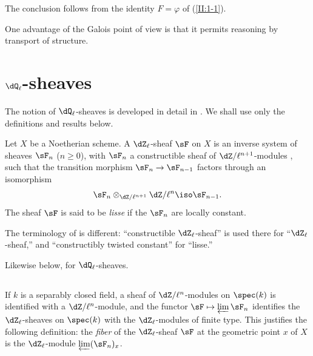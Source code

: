 \documentclass[oneside]{book}
\begin{document}
The conclusion follows from the identity $F=\varphi$ of (\ref{II:1-1}).

One advantage of the Galois point of view is that it permits reasoning by
transport of structure.










\section{\texorpdfstring{$\dQ_\ell$}{Ql}-sheaves}\label{II:2}

The notion of $\dQ_\ell$-sheaves is developed in detail in
\cite[V,VI]{sga5}. We shall use only the definitions and results below.






\begin{definition_}\label{II:2-1}
Let $X$ be a Noetherian scheme. A $\dZ_\ell$-sheaf $\sF$ on $X$ is an
inverse system of sheaves $\sF_n$ ($n\geqslant 0$), with $\sF_n$ a
constructible sheaf of $\dZ/\ell^{n+1}$-modules \cite[IX.2]{sga4}, such that
the transition morphism $\sF_n\to\sF_{n-1}$ factors through an isomorphism
\[
  \sF_n\otimes_{\dZ/\ell^{n+1}} \dZ/\ell^n \iso \sF_{n-1}\text{.}
\]
The sheaf $\sF$ is said to be \emph{lisse} if the $\sF_n$ are locally
constant.
\end{definition_}

The terminology of \cite{sga5} is different: ``constructible
$\dZ_\ell$-sheaf'' is used there for ``$\dZ_\ell$-sheaf,'' and
``constructibly twisted constant'' for ``lisse.''

Likewise below, for $\dQ_\ell$-sheaves.






\subsection{}\label{II:2-2}

If $k$ is a separably closed field, a sheaf of $\dZ/\ell^n$-modules on
$\spec(k)$ is identified with a $\dZ/\ell^n$-module, and the functor
$\sF\mapsto \varprojlim \sF_n$ identifies the $\dZ_\ell$-sheaves on
$\spec(k)$ with the $\dZ_\ell$-modules of finite type. This justifies the
following definition: the \emph{fiber} of the $\dZ_\ell$-sheaf $\sF$ at the
geometric point $x$ of $X$ is the $\dZ_\ell$-module
$\varprojlim (\sF_n)_x$.
\end{document}
